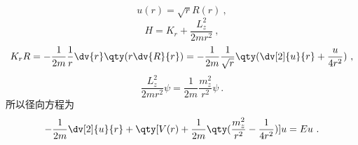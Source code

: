 
\begin{issues}
\issueDraft
\end{issues}


\begin{equation}
u(r) = \sqrt r R(r)~,
\end{equation}
\begin{equation}
H = K_r + \frac{L_z^2}{2m r^2}~,
\end{equation}
\begin{equation}
K_r R = -\frac{1}{2m} \frac1r \dv{r} \qty(r \dv{R}{r}) =  - \frac{1}{2m} \frac{1}{\sqrt r} \qty(\dv[2]{u}{r} + \frac{u}{4 r^2})~,
\end{equation}
\begin{equation}
\frac{L_z^2}{2m r^2}\psi  = \frac{1}{2m} \frac{m_z^2}{r^2}\psi ~.
\end{equation}
所以径向方程为
\begin{equation}
- \frac{1}{2m} \dv[2]{u}{r} + \qty[V(r) + \frac{1}{2m} \qty(\frac{m_z^2}{r^2} - \frac{1}{4 r^2})]u = Eu~.
\end{equation}
